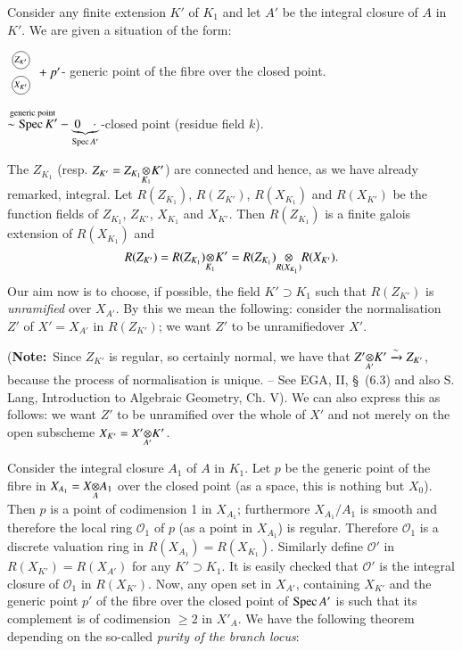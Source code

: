 Consider any finite extension $K'$ of $K_{1}$ and let $A'$ be the
integral closure of $A$ in $K'$. We are given a situation of the form:


$\begin{smallmatrix}\text{\mycirc{$Z_{K'}$}}\\[4pt] \text{\mycirc{$X_{K'}$}}\end{smallmatrix}  
+ p'$- generic point of the fibre over the closed
point. 

\smallskip

$\displaystyle{\mathop{\sim\operatorname{Spec}K'}^{\text{generic
point}}}-\underbrace{0\quad \cdot}_{\operatorname{Spec} A'}$-closed point (residue
field $k$).

The $Z_{K_{1}}$ (resp. $Z_{K'}=\foprod{Z_{K_{1}}}{K'}{K_{1}}$) are
connected and hence, as we have already remarked, integral. Let
$R(Z_{K_{1}})$, $R(Z_{K'})$, $R(X_{K_{1}})$ and $R(X_{K'})$ be the
function fields of $Z_{K_{1}}$, $Z_{K'}$, $X_{K_{1}}$ and
$X_{K'}$. Then $R(Z_{K_{1}})$ is a finite galois extension of
$R(X_{K_{1}})$ and
$$
R(Z_{K'})=\foprod{R(Z_{K_{1}})}{K'}{K_{1}}=\foprod{R(Z_{K_{1}})}{R(X_{K'})}{R(X_{K_{1}})}.
$$ 
Our
aim now is to choose, if possible, the field $K'\supset K_{1}$ such
that $R(Z_{K'})$ is {\em unramified} over $X_{A'}$. By this we mean
the following: consider the normalisation $Z'$ of $X'=X_{A'}$ in
$R(Z_{K'})$; we want $Z'$ to be unramified\pageoriginale over $X'$.


({\bf Note:}~Since $Z_{K'}$ is regular, so certainly normal, we have
that $\foprod{Z'}{K'}{A'}\break \xrightarrow{\sim}Z_{K'}$, because the
process of normalisation is unique. -- See EGA, II, \S\ (6.3) and also
S. Lang, Introduction to Algebraic Geometry, Ch. V). We can also
express this as follows: we want $Z'$ to be unramified over the whole
of $X'$ and not merely on the open subscheme
$X_{K'}=\foprod{X'}{K'}{A'}$. 

Consider the integral closure $A_{1}$ of $A$ in $K_{1}$. Let $p$ be
the generic point of the fibre in $X_{A_{1}}=\foprod{X}{A_{1}}{A}$
over the closed point (as a space, this is nothing but $X_{0}$). Then
$p$ is a point of codimension 1 in $X_{A_{1}}$; furthermore
$X_{A_{1}}/A_{1}$ is smooth and therefore the local ring
$\mathscr{O}_{1}$ of $p$ (as a point in $X_{A_{1}}$) is
regular. Therefore $\mathscr{O}_{1}$ is a discrete valuation ring in
$R(X_{A_{1}})=R(X_{K_{1}})$. Similarly define $\mathscr{O}'$ in
$R(X_{K'})=R(X_{A'})$ for any $K'\supset K_{1}$. It is easily checked
that $\mathscr{O}'$ is the integral closure of $\mathscr{O}_{1}$ in
$R(X_{K'})$. Now, any open set in $X_{A'}$, containing $X_{K'}$ and
the generic point $p'$ of the fibre over the closed point of $\operatorname{Spec}
A'$ is such that its complement is of codimension $\geq 2$ in
$X'_{A}$. We have the following theorem depending on the so-called
{\em purity of the branch locus}:

